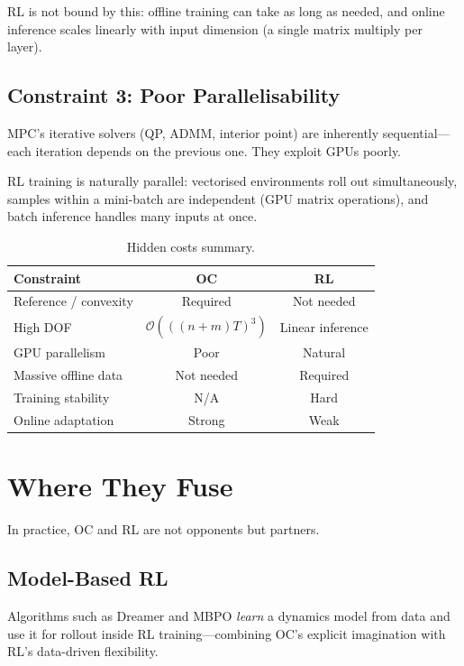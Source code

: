 RL is not bound by this: offline training can take as long as needed, and online inference scales linearly with input dimension (a single matrix multiply per layer).

\subsection{Constraint 3: Poor Parallelisability}

MPC's iterative solvers (QP, ADMM, interior point) are inherently sequential---each iteration depends on the previous one.
They exploit GPUs poorly.

RL training is naturally parallel: vectorised environments roll out simultaneously, samples within a mini-batch are independent (GPU matrix operations), and batch inference handles many inputs at once.

\begin{table}[htbp]
\centering
\caption{Hidden costs summary.}
\begin{tabular}{@{}lcc@{}}
\toprule
\textbf{Constraint} & \textbf{OC} & \textbf{RL} \\
\midrule
Reference / convexity & Required & Not needed \\
High DOF & $\mathcal{O}(((n{+}m)T)^3)$ & Linear inference \\
GPU parallelism & Poor & Natural \\
Massive offline data & Not needed & Required \\
Training stability & N/A & Hard \\
Online adaptation & Strong & Weak \\
\bottomrule
\end{tabular}
\end{table}

\section{Where They Fuse}
\label{sec:fusion}

In practice, OC and RL are not opponents but partners.

\subsection{Model-Based RL}

Algorithms such as Dreamer and MBPO \emph{learn} a dynamics model from data and use it for rollout inside RL training---combining OC's explicit imagination with RL's data-driven flexibility.

